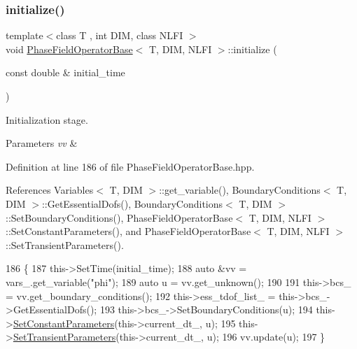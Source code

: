 \subsubsection{\texorpdfstring{initialize()}{initialize()}}
{\footnotesize\ttfamily template$<$class T , int D\+IM, class N\+L\+FI $>$ \\
void \hyperlink{classPhaseFieldOperatorBase}{Phase\+Field\+Operator\+Base}$<$ T, D\+IM, N\+L\+FI $>$\+::initialize (\begin{DoxyParamCaption}\item[{const double \&}]{initial\+\_\+time }\end{DoxyParamCaption})\hspace{0.3cm}{\ttfamily [inherited]}}



Initialization stage. 


\begin{DoxyParams}{Parameters}
{\em vv} & \\
\hline
\end{DoxyParams}


Definition at line 186 of file Phase\+Field\+Operator\+Base.\+hpp.



References Variables$<$ T, D\+I\+M $>$\+::get\+\_\+variable(), Boundary\+Conditions$<$ T, D\+I\+M $>$\+::\+Get\+Essential\+Dofs(), Boundary\+Conditions$<$ T, D\+I\+M $>$\+::\+Set\+Boundary\+Conditions(), Phase\+Field\+Operator\+Base$<$ T, D\+I\+M, N\+L\+F\+I $>$\+::\+Set\+Constant\+Parameters(), and Phase\+Field\+Operator\+Base$<$ T, D\+I\+M, N\+L\+F\+I $>$\+::\+Set\+Transient\+Parameters().


\begin{DoxyCode}
186                                                                                 \{
187   this->SetTime(initial\_time);
188   \textcolor{keyword}{auto} &vv = vars\_.get\_variable(\textcolor{stringliteral}{"phi"});
189   \textcolor{keyword}{auto} u = vv.get\_unknown();
190 
191   this->bcs\_ = vv.get\_boundary\_conditions();
192   this->ess\_tdof\_list\_ = this->bcs\_->GetEssentialDofs();
193   this->bcs\_->SetBoundaryConditions(u);
194   this->\hyperlink{classPhaseFieldOperatorBase_ae28add1cf3731d10726a9665862a725b}{SetConstantParameters}(this->current\_dt\_, u);
195   this->\hyperlink{classPhaseFieldOperatorBase_a07fb8bcd8791bb712681379c160c1ad6}{SetTransientParameters}(this->current\_dt\_, u);
196   vv.update(u);
197 \}
\end{DoxyCode}
\mbox{\label{classPhaseFieldOperatorBase_a55a314426a0d9bbb181cb5d35e8f76e9}} 
